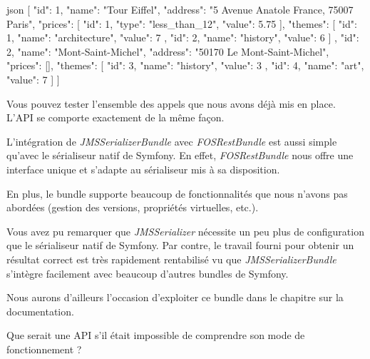 \documentclass[big]{zmdocument}
\begin{document}
\begin{CodeBlock}{json}
[
  {
    "id": 1,
    "name": "Tour Eiffel",
    "address": "5 Avenue Anatole France, 75007 Paris",
    "prices": [
      {
        "id": 1,
        "type": "less_than_12",
        "value": 5.75
      }
    ],
    "themes": [
      {
        "id": 1,
        "name": "architecture",
        "value": 7
      },
      {
        "id": 2,
        "name": "history",
        "value": 6
      }
    ]
  },
  {
    "id": 2,
    "name": "Mont-Saint-Michel",
    "address": "50170 Le Mont-Saint-Michel",
    "prices": [],
    "themes": [
      {
        "id": 3,
        "name": "history",
        "value": 3
      },
      {
        "id": 4,
        "name": "art",
        "value": 7
      }
    ]
  }
]
\end{CodeBlock}



Vous pouvez tester l'ensemble des appels que nous avons déjà mis en place. L'API se comporte exactement de la même façon.



\horizontalLine



L'intégration de \textit{JMSSerializerBundle} avec \textit{FOSRestBundle} est aussi simple qu'avec le sérialiseur natif de Symfony.
En effet, \textit{FOSRestBundle} nous offre une interface unique et s'adapte au sérialiseur mis à sa disposition.



En plus, le bundle  supporte beaucoup de fonctionnalités que nous n'avons pas abordées (gestion des versions, propriétés virtuelles, etc.).



Vous avez pu remarquer que \textit{JMSSerializer} nécessite un peu plus de configuration que le sérialiseur natif de Symfony. Par contre, le travail fourni pour obtenir un résultat correct est très rapidement rentabilisé vu que \textit{JMSSerializerBundle} s’intègre facilement avec beaucoup d'autres bundles de Symfony.



Nous aurons d'ailleurs l'occasion d'exploiter ce bundle dans le chapitre sur la documentation.





\begin{Question}
Que serait une API s'il était impossible de comprendre son mode de fonctionnement ?
\end{Question}
\end{document}
